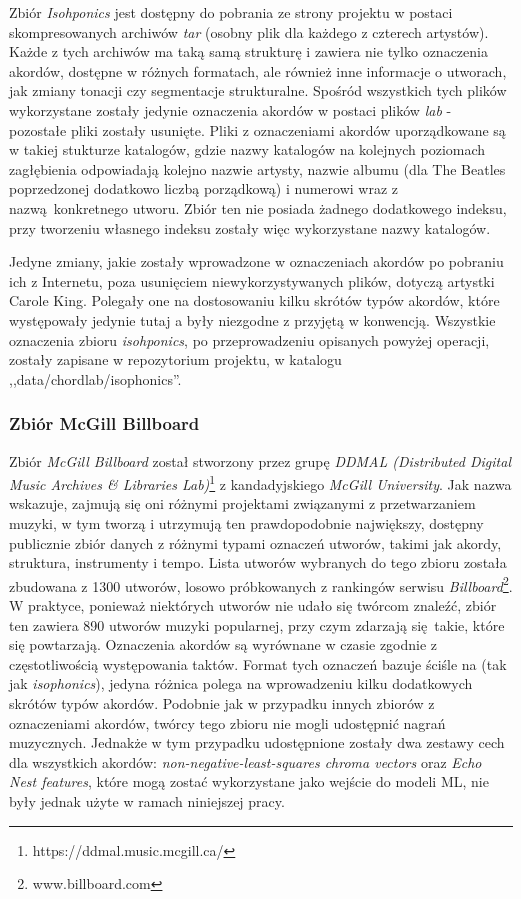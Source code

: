 Zbiór \emph{Isohponics} jest dostępny do pobrania ze strony projektu w postaci skompresowanych
archiwów \emph{tar} (osobny plik dla każdego z czterech artystów). Każde z tych archiwów ma taką
samą strukturę i zawiera nie tylko oznaczenia akordów, dostępne w różnych formatach, ale również
inne informacje o utworach, jak zmiany tonacji czy segmentacje strukturalne. Spośród wszystkich tych
plików wykorzystane zostały jedynie oznaczenia akordów w postaci plików \emph{lab} - pozostałe pliki
zostały usunięte. Pliki z oznaczeniami akordów uporządkowane są w takiej stukturze katalogów, gdzie
nazwy katalogów na kolejnych poziomach zagłębienia odpowiadają kolejno nazwie artysty, nazwie albumu
(dla The Beatles poprzedzonej dodatkowo liczbą porządkową) i numerowi wraz z nazwą konkretnego
utworu. Zbiór ten nie posiada żadnego dodatkowego indeksu, przy tworzeniu własnego indeksu zostały
więc wykorzystane nazwy katalogów.

Jedyne zmiany, jakie zostały wprowadzone w oznaczeniach akordów po pobraniu ich z Internetu, poza
usunięciem niewykorzystywanych plików, dotyczą artystki Carole King. Polegały one na dostosowaniu
kilku skrótów typów akordów, które występowały jedynie tutaj a były niezgodne z przyjętą w
\cite{harte_towards_nodate} konwencją. Wszystkie oznaczenia zbioru \emph{isohponics}, po
przeprowadzeniu opisanych powyżej operacji, zostały zapisane w repozytorium projektu, w katalogu
,,data/chordlab/isophonics''.


\subsubsection{Zbiór McGill Billboard}

Zbiór \emph{McGill Billboard} \cite{burgoyne_expert_2011} został stworzony przez grupę \emph{DDMAL
(Distributed Digital Music Archives \& Libraries Lab)}\footnote{https://ddmal.music.mcgill.ca/} z
kandadyjskiego \emph{McGill University}. Jak nazwa wskazuje, zajmują się oni różnymi projektami
związanymi z przetwarzaniem muzyki, w tym tworzą i utrzymują ten prawdopodobnie największy, dostępny
publicznie zbiór danych z różnymi typami oznaczeń utworów, takimi jak akordy, struktura, instrumenty
i tempo. Lista utworów wybranych do tego zbioru została zbudowana z 1300 utworów, losowo
próbkowanych z rankingów serwisu \emph{Billboard}\footnote{www.billboard.com}. W praktyce, ponieważ
niektórych utworów nie udało się twórcom znaleźć, zbiór ten zawiera 890 utworów muzyki popularnej,
przy czym zdarzają się takie, które się powtarzają. Oznaczenia akordów są wyrównane w czasie zgodnie
z częstotliwością występowania taktów. Format tych oznaczeń bazuje ściśle na
\cite{harte_towards_nodate} (tak jak \emph{isophonics}), jedyna różnica polega na wprowadzeniu kilku
dodatkowych skrótów typów akordów.  Podobnie jak w przypadku innych zbiorów z oznaczeniami akordów,
twórcy tego zbioru nie mogli udostępnić nagrań muzycznych. Jednakże w tym przypadku udostępnione
zostały dwa zestawy cech dla wszystkich akordów: \emph{non-negative-least-squares chroma vectors}
oraz \emph{Echo Nest features}, które mogą zostać wykorzystane jako wejście do modeli ML, nie były
jednak użyte w ramach niniejszej pracy.

